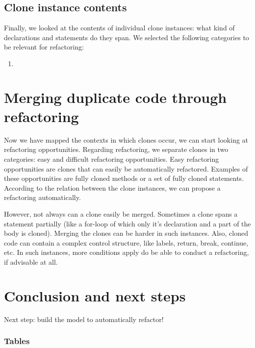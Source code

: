 \documentclass[a4paper]{article}
\begin{document}

\subsection{Clone instance contents}
Finally, we looked at the contents of individual clone instances: what kind of declarations and statements do they span. We selected the following categories to be relevant for refactoring:
\begin{enumerate}
  \item
\end{enumerate}


\section{Merging duplicate code through refactoring}
Now we have mapped the contexts in which clones occur, we can start looking at refactoring opportunities. Regarding refactoring, we separate clones in two categories: easy and difficult refactoring opportunities. Easy refactoring opportunities are clones that can easily be automatically refactored. Examples of these opportunities are fully cloned methods or a set of fully cloned statements. According to the relation between the clone instances, we can propose a refactoring automatically.

However, not always can a clone easily be merged. Sometimes a clone spans a statement partially (like a for-loop of which only it's declaration and a part of the body is cloned). Merging the clones can be harder in such instances. Also, cloned code can contain a complex control structure, like labels, return, break, continue, etc. In such instances, more conditions apply do be able to conduct a refactoring, if advisable at all.


\section{Conclusion and next steps}
Next step: build the model to automatically refactor!


\subsubsection{Tables}
\end{document}
